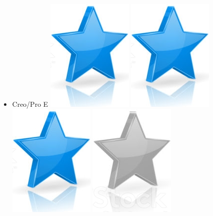 \documentclass[10pt,a4paper,sans]{article}
\begin{document}
\begin{minipage}[t]{0.28\textwidth}
\begin{mdframed}[style=cadreCompetences]
\begin{itemize}
            \item{Creo/Pro E
                    \hfill
                    \includegraphics[scale=0.20]{img/star.png} \hspace{-0.2cm}
                    \includegraphics[scale=0.20]{img/star.png} \hspace{-0.2cm}
                    \includegraphics[scale=0.20]{img/star.png} \hspace{-0.2cm}
                    \includegraphics[scale=0.20]{img/empty_star.png} \hspace{-0.2cm}
}
\end{itemize}
\end{mdframed}
\end{minipage}
\end{document}
